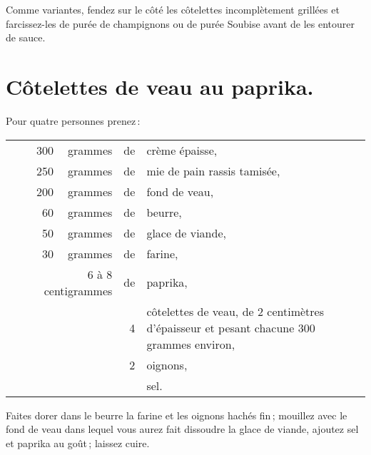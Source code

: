 \sk

Comme variantes, fendez sur le côté les côtelettes incomplètement grillées et
farcissez-les de purée de champignons ou de purée Soubise avant de les entourer
de sauce.

\section*{\centering Côtelettes de veau au paprika.}
{}

Pour quatre personnes prenez :

\medskip

\footnotesize
\begin{longtable}{rp{4em}rrrp{16em}}
& & 300 & grammes & de & crème épaisse,                                                                   \\
& & 250 & grammes & de & mie de pain rassis tamisée,                                                      \\
& & 200 & grammes & de & fond de veau,                                                                    \\
& &  60 & grammes & de & beurre,                                                                          \\
& &  50 & grammes & de & glace de viande,                                                                 \\
& &  30 & grammes & de & farine,                                                                          \\
& \multicolumn{3}{r}{6 à 8 centigrammes} & de & paprika,                                                  \\
& &     &         &  4 & côtelettes de veau, de 2 centimètres d'épaisseur
                         et pesant chacune 300 grammes environ,                                           \\
& &     &         &  2 & oignons,                                                                         \\
& &     &         &    & sel.                                                                             \\
\end{longtable}
\normalsize

Faites dorer dans le beurre la farine et les oignons hachés fin ; mouillez avec
le fond de veau dans lequel vous aurez fait dissoudre la glace de viande, ajoutez
sel et paprika au goût ; laissez cuire.


